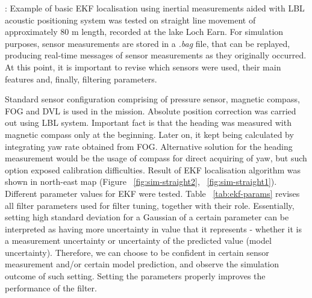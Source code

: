 : Example of basic EKF localisation using inertial measurements aided with LBL acoustic positioning system was tested on straight line movement of approximately 80 m length, recorded at the lake Loch Earn. For simulation purposes, sensor measurements are stored in a \textit{.bag} file, that can be replayed, producing real-time messages of sensor measurements as they originally occurred. At this point, it is important to revise which sensors were used, their main features and, finally, filtering parameters. 

Standard sensor configuration comprising of pressure sensor, magnetic compass, FOG and DVL is used in the mission. Absolute position correction was carried out using LBL system. Important fact is that the heading was measured with magnetic compass only at the beginning. Later on, it kept being calculated by integrating yaw rate obtained from FOG. Alternative solution for the heading measurement would be the usage of compass for direct acquiring of yaw, but such option exposed calibration difficulties. Result of EKF localisation algorithm was shown in north-east map (Figure ~\ref{fig:sim-straight2}, ~\ref{fig:sim-straight1}). Different parameter values for EKF were tested. Table ~\ref{tab:ekf-params} revises all filter parameters used for filter tuning, together with their role. Essentially, setting high standard deviation for a Gaussian of a certain parameter can be interpreted as having more uncertainty in value that it represents - whether it is a measurement uncertainty or uncertainty of the predicted value (model uncertainty). Therefore, we can choose to be confident in certain sensor measurement and/or certain model prediction, and observe the simulation outcome of such setting. Setting the parameters properly improves the performance of the filter.  
\addtocounter{footnote}{1}
\footnotetext[\value{footnote}]{as it appears in algorithm equations}  
